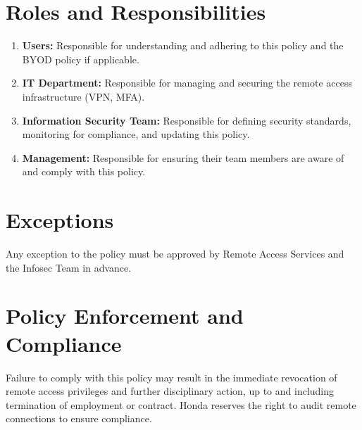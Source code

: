 \section{Roles and Responsibilities}
\begin{enumerate}
    \item \textbf{Users:} Responsible for understanding and adhering to this policy and the BYOD policy if applicable.
    \item \textbf{IT Department:} Responsible for managing and securing the remote access infrastructure (VPN, MFA).
    \item \textbf{Information Security Team:} Responsible for defining security standards, monitoring for compliance, and updating this policy.
    \item \textbf{Management:} Responsible for ensuring their team members are aware of and comply with this policy.
\end{enumerate}

\section{Exceptions}
Any exception to the policy must be approved by Remote Access Services and the Infosec Team in advance.

\section{Policy Enforcement and Compliance}
Failure to comply with this policy may result in the immediate revocation of remote access privileges and further disciplinary action, up to and including termination of employment or contract. Honda reserves the right to audit remote connections to ensure compliance.
